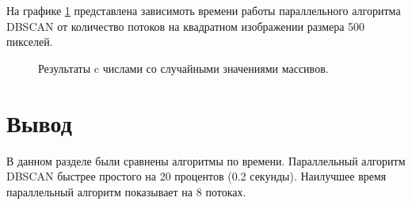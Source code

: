 На графике \ref{graph:j} представлена зависимоть времени работы параллельного алгоритма DBSCAN от количество потоков на квадратном изображении размера 500 пикселей.

\begin{figure}[ht!]
	\begin{center}
		\captionsetup{singlelinecheck = false, justification=centerfirst}
		\centering
		\caption{Результаты c числами со случайными значениями массивов.}
		\label{graph:j}
	\end{center}
	
\end{figure}

\newpage

\section*{Вывод}

В данном разделе были сравнены алгоритмы по времени.
Параллельный алгоритм DBSCAN быстрее простого на 20 процентов (0.2 секунды).
Наилучшее время параллельный алгоритм показывает на 8 потоках.  
 
